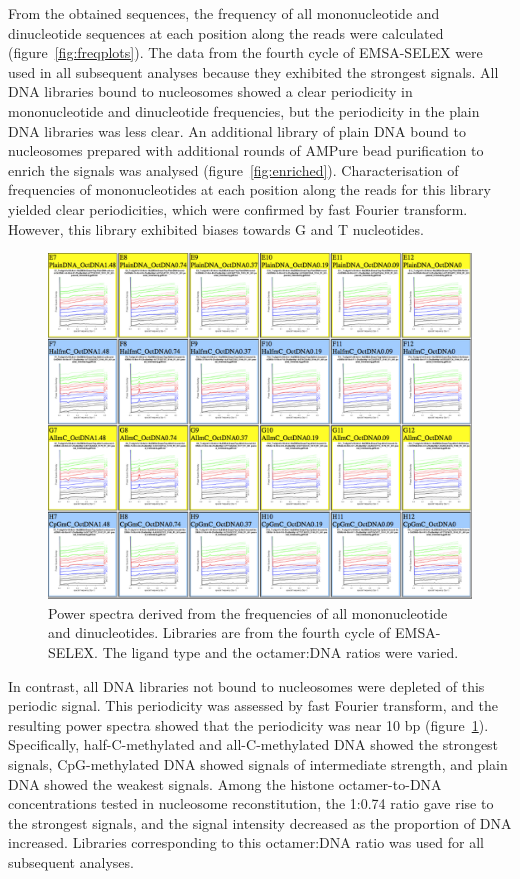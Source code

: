 \documentclass[parskip=full, numbers=noenddot]{scrreprt}
\begin{document}
From the obtained sequences, the frequency of all mononucleotide and dinucleotide sequences at each position along the reads were calculated (figure~\ref{fig:freqplots}).  The data from the fourth cycle of EMSA-SELEX were used in all subsequent analyses because they exhibited the strongest signals.  All DNA libraries bound to nucleosomes showed a clear periodicity in mononucleotide and dinucleotide frequencies, but the periodicity in the plain DNA libraries was less clear.
An additional library of plain DNA bound to nucleosomes prepared with additional rounds of AMPure bead purification to enrich the signals was analysed (figure~\ref{fig:enriched}).  Characterisation of frequencies of mononucleotides at each position along the reads for this library yielded clear periodicities, which were confirmed by fast Fourier transform.  However, this library exhibited biases towards G and T nucleotides.

\begin{figure}[htpb]
  \centering
  \includegraphics[width=\textwidth]{emsacycle4all}
  \caption{Power spectra derived from the frequencies of all mononucleotide and dinucleotides.  Libraries are from the fourth cycle of EMSA-SELEX.  The ligand type and the octamer:DNA ratios were varied.}
  \label{fig:powerspectra}
\end{figure}

In contrast, all DNA libraries not bound to nucleosomes were depleted of this periodic signal.  This periodicity was assessed by fast Fourier transform, and the resulting power spectra showed that the periodicity was near 10 bp (figure~\ref{fig:powerspectra}).  Specifically, half-C-methylated and all-C-methylated DNA showed the strongest signals, %
CpG-methylated DNA showed signals of intermediate strength, and plain DNA showed the weakest signals.  Among the histone octamer-to-DNA concentrations tested in nucleosome reconstitution, the 1:0.74 ratio gave rise to the strongest signals, and the signal intensity decreased as the proportion of DNA increased.  Libraries corresponding to this octamer:DNA ratio was used for all subsequent analyses.
\end{document}

